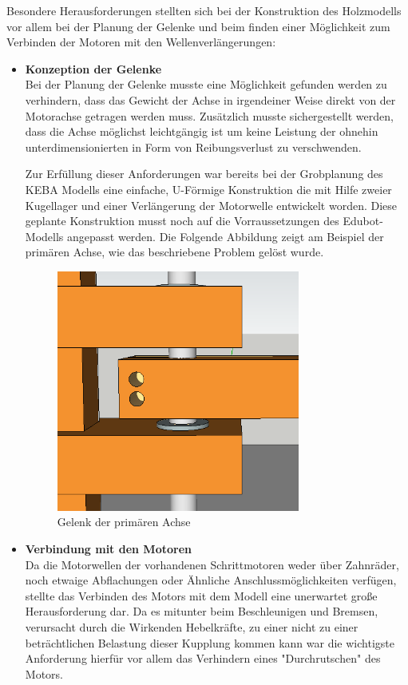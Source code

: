 Besondere Herausforderungen stellten sich bei der Konstruktion des Holzmodells vor allem bei der Planung der Gelenke und beim finden einer Möglichkeit zum Verbinden der Motoren mit den Wellenverlängerungen:
\begin{itemize}
\item \textbf{Konzeption der Gelenke}\\
Bei der Planung der Gelenke musste eine Möglichkeit gefunden werden zu verhindern, dass das Gewicht der Achse in irgendeiner Weise direkt von der Motorachse getragen werden muss. Zusätzlich musste sichergestellt werden, dass die Achse möglichst leichtgängig ist um keine Leistung der ohnehin unterdimensionierten in Form von Reibungsverlust zu verschwenden.

Zur Erfüllung dieser Anforderungen war bereits bei der Grobplanung des KEBA Modells eine einfache, U-Förmige Konstruktion die mit Hilfe zweier Kugellager und einer Verlängerung der Motorwelle entwickelt worden. Diese geplante Konstruktion musst noch auf die Vorraussetzungen des Edubot-Modells angepasst werden. Die Folgende Abbildung zeigt am Beispiel der primären Achse, wie das beschriebene Problem gelöst wurde.

\begin{figure}[H]
  \centering
  \begin{minipage}[t]{8 cm}
  	\centering
  	\includegraphics[width=8cm]{images/primary_gelenk} 
    \caption{Gelenk der primären Achse}
  \end{minipage}
\end{figure}

\item \textbf{Verbindung mit den Motoren}\\
Da die Motorwellen der vorhandenen Schrittmotoren weder über Zahnräder, noch etwaige Abflachungen oder Ähnliche Anschlussmöglichkeiten verfügen, stellte das Verbinden des Motors mit dem Modell eine unerwartet große Herausforderung dar. Da es mitunter beim Beschleunigen und Bremsen, verursacht durch die Wirkenden Hebelkräfte, zu einer nicht zu einer beträchtlichen Belastung dieser Kupplung kommen kann war die wichtigste Anforderung hierfür vor allem das Verhindern eines "Durchrutschen" des Motors. 


\end{itemize}
